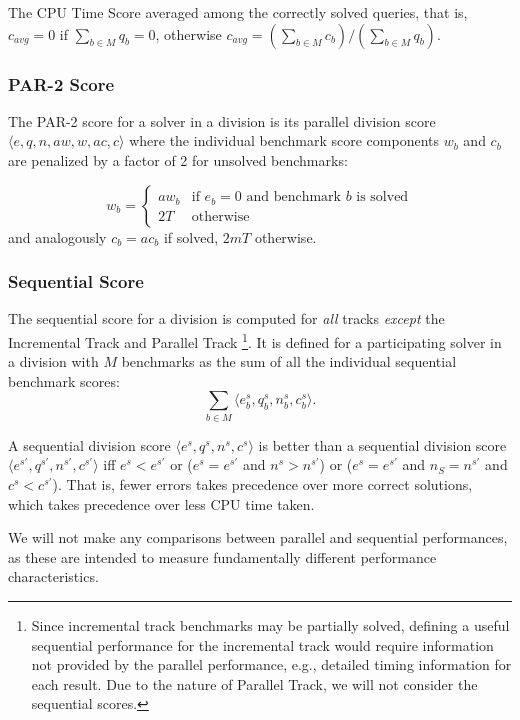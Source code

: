 \documentclass[12pt]{article}
\newcommand{\inctrack}{Incremental Track\xspace}
\newcommand{\paralleltrack}{Parallel Track\xspace}
\begin{document}
The CPU Time Score averaged among the correctly solved queries,
that is,
$c_{avg} = 0$ if $\sum_{b\in M} q_b = 0$,
otherwise $c_{avg} = (\sum_{b\in M} c_b)/(\sum_{b\in M} q_b)$.

\subsubsection{PAR-2 Score}
The PAR-2 score for a solver in a division is its parallel division score
$\langle e, q, n, \mathit{aw}, w, \mathit{ac}, c \rangle$ where the individual
benchmark score components $w_b$ and $c_b$ are penalized by a factor of 2 for
unsolved benchmarks:

$$w_b = \begin{cases} \mathit{aw}_b & \text{if } e_b = 0 \text{ and benchmark }
b \text{ is solved} \\ 2T & \text{otherwise} \end{cases}$$
and analogously $c_b = \mathit{ac}_b$ if solved, $2mT$ otherwise.


\subsubsection{Sequential Score}

The sequential score for a division is computed for \emph{all} tracks
\emph{except} the \inctrack and \paralleltrack
\footnote{Since incremental track benchmarks may be partially
solved, defining a useful sequential performance for the incremental track
would require information not provided by the parallel performance, e.g.,
detailed timing information for each result.  Due to the nature of
\paralleltrack, we will not consider the sequential
scores.}.  It is defined for a
participating solver in a division with $M$ benchmarks as the sum of all the
individual sequential benchmark scores:
$$\sum_{b\in M} \langle e_b^s, q_b^s, n_b^s, c_b^s\rangle.$$

\noindent
A sequential division score $\langle e^s, q^s, n^s, c^s\rangle$ is better than a
sequential division score $\langle e^{s'}, q^{s'}, n^{s'}, c^{s'}\rangle$ iff
$e^s < e^{s'}$ or ($e^s = e^{s'}$ and $n^s > n^{s'}$) or ($e^s = e^{s'}$ and
$n_S = n^{s'}$ and $c^s < c^{s'}$).
That is, fewer errors takes precedence over more correct solutions,
which takes precedence over less CPU time taken.

We will not make any comparisons between parallel and sequential performances,
as these are intended to measure fundamentally different performance
characteristics.
\end{document}
